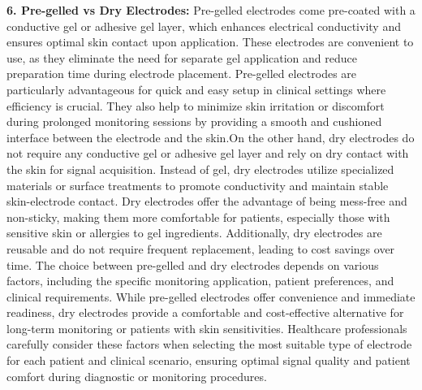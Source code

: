 \textbf{6. Pre-gelled vs Dry Electrodes:}
         Pre-gelled electrodes come pre-coated with a conductive gel or adhesive gel layer, which enhances electrical conductivity and ensures optimal skin contact upon application. These electrodes are convenient to use, as they eliminate the need for separate gel application and reduce preparation time during electrode placement. Pre-gelled electrodes are particularly advantageous for quick and easy setup in clinical settings where efficiency is crucial. They also help to minimize skin irritation or discomfort during prolonged monitoring sessions by providing a smooth and cushioned interface between the electrode and the skin.On the other hand, dry electrodes do not require any conductive gel or adhesive gel layer and rely on dry contact with the skin for signal acquisition. Instead of gel, dry electrodes utilize specialized materials or surface treatments to promote conductivity and maintain stable skin-electrode contact. Dry electrodes offer the advantage of being mess-free and non-sticky, making them more comfortable for patients, especially those with sensitive skin or allergies to gel ingredients. Additionally, dry electrodes are reusable and do not require frequent replacement, leading to cost savings over time.
         The choice between pre-gelled and dry electrodes depends on various factors, including the specific monitoring application, patient preferences, and clinical requirements. While pre-gelled electrodes offer convenience and immediate readiness, dry electrodes provide a comfortable and cost-effective alternative for long-term monitoring or patients with skin sensitivities. Healthcare professionals carefully consider these factors when selecting the most suitable type of electrode for each patient and clinical scenario, ensuring optimal signal quality and patient comfort during diagnostic or monitoring procedures.

